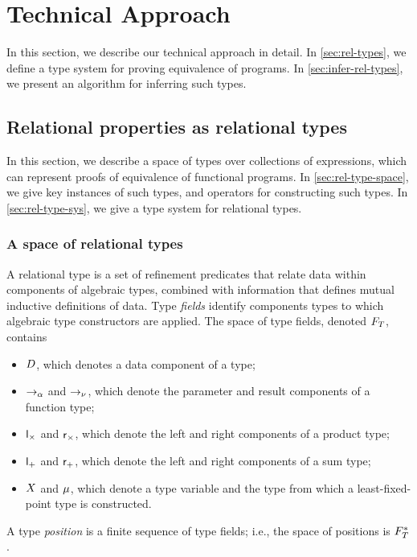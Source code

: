 \section{Technical Approach}
%
In this section, we describe our technical approach in detail.
%
In \autoref{sec:rel-types}, we define a type system for proving
equivalence of programs.
%
In \autoref{sec:infer-rel-types}, we present an algorithm for
inferring such types.

\subsection{Relational properties as relational types}
\label{sec:rel-types}
%
In this section, we describe a space of types over collections of
expressions, which can represent proofs of equivalence of functional
programs.
%
In \autoref{sec:rel-type-space}, we give key instances of such types,
and operators for constructing such types.
%
In \autoref{sec:rel-type-sys}, we give a type system for relational
types.

\subsubsection{A space of relational types}
\label{sec:rel-type-space}
A relational type is a set of refinement predicates that relate data
within components of algebraic types, combined with information that
defines mutual inductive definitions of data.
%
Type \emph{fields} identify components types to which algebraic type
constructors are applied.
%
The space of type fields, denoted $F_T$, contains
%
\begin{itemize}
\item %
  $D$, which denotes a data component of a type;
\item %
  $\to_{\alpha}$ and $\to_{\nu}$, which denote the parameter and
  result components of a function type;
\item %
  $\mathsf{l}_{\times}$ and $\mathsf{r}_{\times}$, which denote the left and right
  components of a product type;
\item %
  $\mathsf{l}_{+}$ and $\mathsf{r}_{+}$, which denote the left and right
  components of a sum type;
\item %
  $X$ and $\mu$, which denote a type variable and the
  type from which a least-fixed-point type is constructed.
\end{itemize}
A type \emph{position} is a finite sequence of type fields;
%
i.e., the space of positions is $F_T^{*}$.
%

